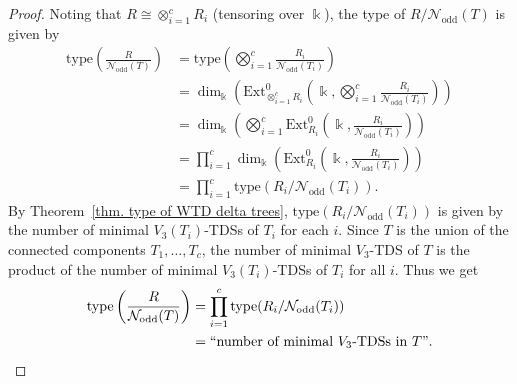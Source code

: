 \documentclass[12pt, reqno]{amsart}
\theoremstyle{definition}
\theoremstyle{plain}
\theoremstyle{definition}
\newcommand{\tp}{\mbox{type}}
\newcommand{\Ext}{\mbox{Ext}}
\newcommand{\kk}{\Bbbk}
\newcommand{\NN}{\mathcal{N}}
\begin{document}
\begin{proof}
Noting that $R \cong \otimes_{i = 1}^c R_i$ (tensoring over $\kk$), the type of $R/\NN_{\text{odd}}(T)$ is given by
\begin{align*}
    \tp\left(\frac{R}{\NN_{\text{odd}}(T)}\right)  &= \tp\left(\bigotimes_{i = 1}^c \frac{R_i}{\NN_{\text{odd}}(T_i)}\right)\\
    &= \dim_\kk\left(\Ext^0_{\otimes_{i = 1}^c R_i}\left(\kk,\bigotimes_{i = 1}^c \frac{R_i}{\NN_{\text{odd}}(T_i)}\right) \right)\\
    &= \dim_\kk\left(\bigotimes_{i = 1}^c \Ext_{R_i}^0\left(\kk,\frac{R_i}{\NN_{\text{odd}}(T_i)}\right) \right)\\
    &= \prod_{i = 1}^c \dim_\kk\left(\Ext_{R_i}^0\left( \kk,\frac{R_i}{\NN_{\text{odd}}(T_i)}\right) \right)\\
    &= \prod_{i = 1}^c\tp(R_i/\NN_{\text{odd}}(T_i)).
\end{align*}
By Theorem~\ref{thm. type of WTD delta trees}, $\tp(R_i/\NN_{\text{odd}}(T_i))$ is given by the number of minimal $V_3(T_i)$-TDSs of $T_i$ for each $i$.
Since $T$ is the union of the connected components $T_1,\dots,T_c$, the number of minimal $V_3$-TDS of $T$ is the product of the number of minimal $V_3(T_i)$-TDSs of $T_i$ for all $i$.
Thus we get
\begin{align*}
\tp\left(\frac{R}{\NN_{\text{odd}}(T)}\right) &= \prod_{i = 1}^c\tp(R_i/\NN_{\text{odd}}(T_i))\\
&= ``\mbox{number of minimal $V_3$-TDSs in }T".
\end{align*}
\end{proof}
\end{document}

